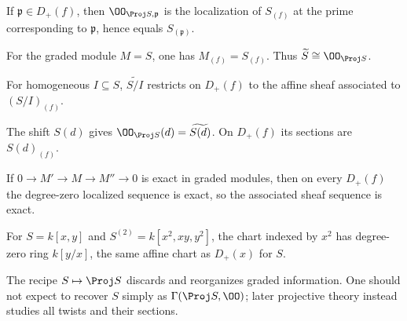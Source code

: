 \begin{example}\label{ex:vi35-10}
If \(\mathfrak p\in D_+(f)\), then \(\OO_{\Proj S,\mathfrak p}\) is the localization of \(S_{(f)}\) at the prime corresponding to \(\mathfrak p\), hence equals \(S_{(\mathfrak p)}\).
\end{example}

\begin{example}\label{ex:vi35-11}
For the graded module \(M=S\), one has \(M_{(f)}=S_{(f)}\). Thus \(\widetilde S\cong\OO_{\Proj S}\).
\end{example}

\begin{example}\label{ex:vi35-12}
For homogeneous \(I\subseteq S\), \(\widetilde{S/I}\) restricts on \(D_+(f)\) to the affine sheaf associated to \((S/I)_{(f)}\).
\end{example}

\begin{example}\label{ex:vi35-13}
The shift \(S(d)\) gives \(\OO_{\Proj S}(d)=\widetilde{S(d)}\).  On \(D_+(f)\) its sections are \(S(d)_{(f)}\).
\end{example}

\begin{example}\label{ex:vi35-14}
If \(0\to M'\to M\to M''\to0\) is exact in graded modules, then on every \(D_+(f)\) the degree-zero localized sequence is exact, so the associated sheaf sequence is exact.
\end{example}

\begin{example}\label{ex:vi35-15}
For \(S=k[x,y]\) and \(S^{(2)}=k[x^2,xy,y^2]\), the chart indexed by \(x^2\) has degree-zero ring \(k[y/x]\), the same affine chart as \(D_+(x)\) for \(S\).
\end{example}

\begin{example}\label{ex:vi35-16}
The recipe \(S\mapsto\Proj S\) discards and reorganizes graded information.  One should not expect to recover \(S\) simply as \(\Gamma(\Proj S,\OO)\); later projective theory instead studies all twists and their sections.
\end{example}
